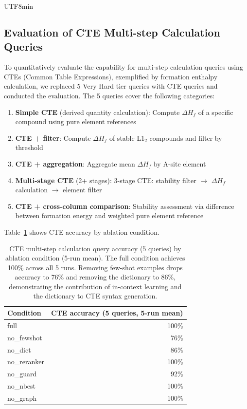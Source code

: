 \documentclass[sn-mathphys,Numbered]{sn-jnl}
\begin{document}
\begin{CJK}{UTF8}{min}
\subsection{Evaluation of CTE Multi-step Calculation Queries}
\label{sec:cte_evaluation}

To quantitatively evaluate the capability for multi-step
calculation queries using CTEs (Common Table Expressions),
exemplified by formation enthalpy calculation, we replaced 5 Very
Hard tier queries with CTE queries and conducted the evaluation.
The 5 queries cover the following categories:

\begin{enumerate}[nosep]
  \item \textbf{Simple CTE} (derived quantity calculation):
    Compute $\Delta H_f$ of a specific compound using pure element
    references
  \item \textbf{CTE + filter}:
    Compute $\Delta H_f$ of stable L1$_2$ compounds and filter by
    threshold
  \item \textbf{CTE + aggregation}:
    Aggregate mean $\Delta H_f$ by A-site element
  \item \textbf{Multi-stage CTE} (2+ stages):
    3-stage CTE: stability filter $\to$ $\Delta H_f$ calculation
    $\to$ element filter
  \item \textbf{CTE + cross-column comparison}:
    Stability assessment via difference between formation energy
    and weighted pure element reference
\end{enumerate}

Table~\ref{tab:cte_results} shows CTE accuracy by ablation
condition.

\begin{table}[t]
\centering
\caption{CTE multi-step calculation query accuracy (5 queries) by
ablation condition (5-run mean). The full condition achieves 100\%
across all 5 runs. Removing few-shot examples drops accuracy to
76\% and removing the dictionary to 86\%, demonstrating the
contribution of in-context learning and the dictionary to CTE
syntax generation.}
\label{tab:cte_results}
\small
\begin{tabular}{@{}lr@{}}
\toprule
Condition & CTE accuracy (5 queries, 5-run mean) \\
\midrule
full          & 100\% \\
no\_fewshot   & 76\% \\
no\_dict      & 86\% \\
no\_reranker  & 100\% \\
no\_guard     & 92\% \\
no\_nbest     & 100\% \\
no\_graph     & 100\% \\
\bottomrule
\end{tabular}
\end{table}


\end{CJK}
\end{document}
